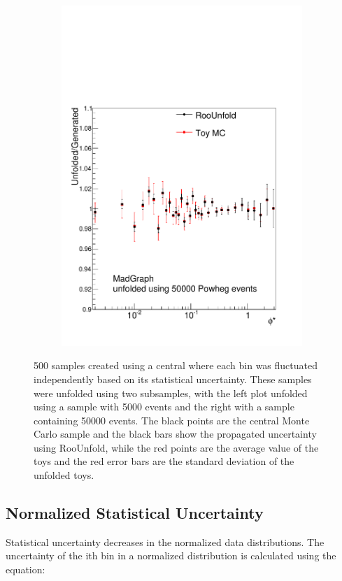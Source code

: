 \begin{figure}[!htbp]
\begin{subfigure}[b]{0.49\textwidth}
     \includegraphics[width=\linewidth]{figures/Unfolding/BinM_PM_50000.pdf}
     \caption{}
    \end{subfigure}
    \caption{500 samples created using a central \MADGRAPH where each bin was fluctuated independently based on its statistical uncertainty. These samples were unfolded using two \POWHEG subsamples, with the left plot unfolded using a \POWHEG sample with 5000 events and the right with a sample containing 50000 events. The black points are the central Monte Carlo sample and the black bars show the propagated uncertainty using RooUnfold, while the red points are the average value of the toys and the red error bars are the standard deviation of the unfolded toys.}
    \label{fig:BinMigrationWToysSmallerSamples}
\end{figure}




\subsection{Normalized Statistical Uncertainty}
Statistical uncertainty decreases in the normalized data distributions. The uncertainty of the ith bin in a normalized distribution is calculated using the equation:

